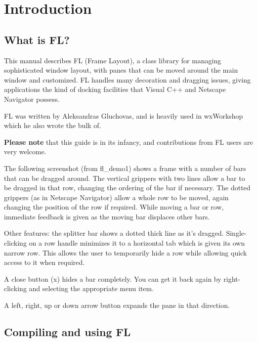 \chapter{Introduction}\label{introduction}
%
%
\setfooter{\thepage}{}{}{}{}{\thepage}%

\section{What is FL?}\label{whatisfl}

This manual describes FL (Frame Layout), a
class library for managing sophisticated window layout,
with panes that can be moved around the main window
and customized. FL handles many decoration and dragging
issues, giving applications the kind of docking facilities
that Visual C++ and Netscape Navigator possess.

FL was written by Aleksandras Gluchovas, and is heavily used in
wxWorkshop which he also wrote the bulk of.

{\bf Please note} that this guide is in its infancy, and contributions
from FL users are very welcome.

The following screenshot (from fl\_demo1) shows a frame with a number of
bars that can be dragged around. The vertical grippers with
two lines allow a bar to be dragged in that row, changing the
ordering of the bar if necessary.
The dotted grippers (as in Netscape Navigator) allow
a whole row to be moved, again changing the position of the row
if required. While moving a bar or row, immediate feedback
is given as the moving bar displaces other bars.

Other features: the splitter bar shows a dotted thick line as
it's dragged. Single-clicking on a row handle minimizes it to
a horizontal tab which is given its own narrow row. This allows
the user to temporarily hide a row while allowing quick access
to it when required.

A close button (x) hides a bar completely. You can get it back again
by right-clicking and selecting the appropriate menu item.

A left, right, up or down arrow button expands the pane in that direction.


\section{Compiling and using FL}

